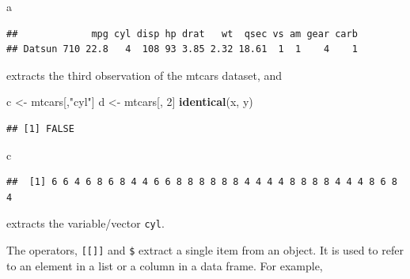 \documentclass[
  12pt,
  oneside]{book}
\newenvironment{Shaded}{\begin{snugshade}}{\end{snugshade}}
\newcommand{\DecValTok}[1]{\textcolor[rgb]{0.00,0.00,0.81}{#1}}
\newcommand{\FunctionTok}[1]{\textcolor[rgb]{0.13,0.29,0.53}{\textbf{#1}}}
\newcommand{\NormalTok}[1]{#1}
\newcommand{\OtherTok}[1]{\textcolor[rgb]{0.56,0.35,0.01}{#1}}
\newcommand{\SpecialCharTok}[1]{\textcolor[rgb]{0.81,0.36,0.00}{\textbf{#1}}}
\newcommand{\StringTok}[1]{\textcolor[rgb]{0.31,0.60,0.02}{#1}}
\begin{document}
\begin{Shaded}
\begin{Highlighting}[]
\NormalTok{a}
\end{Highlighting}
\end{Shaded}

\begin{verbatim}
##             mpg cyl disp hp drat   wt  qsec vs am gear carb
## Datsun 710 22.8   4  108 93 3.85 2.32 18.61  1  1    4    1
\end{verbatim}

extracts the third observation of the mtcars dataset, and

\begin{Shaded}
\begin{Highlighting}[]
\NormalTok{c }\OtherTok{\textless{}{-}}\NormalTok{ mtcars[,}\StringTok{"cyl"}\NormalTok{]}
\NormalTok{d }\OtherTok{\textless{}{-}}\NormalTok{ mtcars[, }\DecValTok{2}\NormalTok{]}
\FunctionTok{identical}\NormalTok{(x, y)}
\end{Highlighting}
\end{Shaded}

\begin{verbatim}
## [1] FALSE
\end{verbatim}

\begin{Shaded}
\begin{Highlighting}[]
\NormalTok{c}
\end{Highlighting}
\end{Shaded}

\begin{verbatim}
##  [1] 6 6 4 6 8 6 8 4 4 6 6 8 8 8 8 8 8 4 4 4 4 8 8 8 8 4 4 4 8 6 8 4
\end{verbatim}

extracts the variable/vector \texttt{cyl}.

The operators, \texttt{{[}{[}{]}{]}} and \texttt{\$} extract a single item from an object. It is used to refer to an element in a list or a column in a data frame. For example,

\begin{Shaded}
\end{Shaded}
\end{document}
